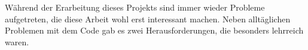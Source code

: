 \documentclass[../main.tex]{subfiles}
\begin{document}
Während der Erarbeitung dieses Projekts sind immer wieder Probleme aufgetreten, die diese Arbeit wohl erst interessant machen.
Neben alltäglichen Problemen mit dem Code gab es zwei Herausforderungen, die besonders lehrreich waren.
\end{document}
